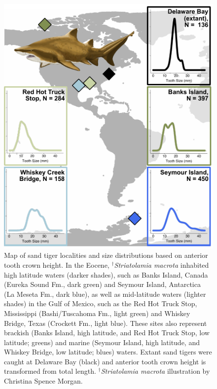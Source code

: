 \documentclass[]{rsos}%
\begin{document}
\clearpage


\begin{figure}
    \centering
    \includegraphics[width=0.5\linewidth]{Shark_Map4C.pdf}
    \caption{Map of sand tiger localities and size distributions based on anterior tooth crown height. 
    In the Eocene, ${}^\dag$\emph{Striatolamia macrota} inhabited high latitude waters (darker shades), such as Banks Island, Canada (Eureka Sound Fm., dark green) and Seymour Island, Antarctica (La Meseta Fm., dark blue), as well as mid-latitude waters (lighter shades) in the Gulf of Mexico, such as the Red Hot Truck Stop, Mississippi (Bashi/Tuscahoma Fm., light green) and Whiskey Bridge, Texas (Crockett Fm., light blue). 
    These sites also represent brackish (Banks Island, high latitude, and Red Hot Truck Stop, low latitude; greens) and marine (Seymour Island, high latitude, and Whiskey Bridge, low latitude; blues) waters. 
    Extant sand tigers were caught at Delaware Bay (black) and anterior tooth crown height is transformed from total length. ${}^\dag$\emph{Striatolamia macrota} illustration by Christina Spence Morgan.}
\label{fig:map}
\end{figure}
\end{document}

